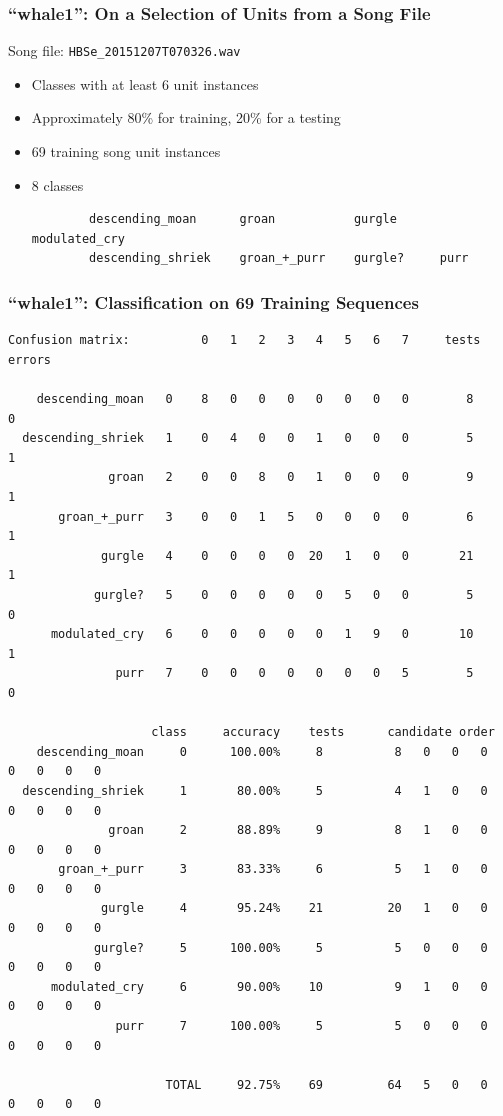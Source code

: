 \documentclass{beamer}
\begin{document}
\begin{frame}[fragile]
\frametitle{``whale1'': On a Selection of Units from a Song File}

Song file: \verb|HBSe_20151207T070326.wav|

\begin{itemize}
    \item Classes with at least 6 unit instances
    \item Approximately 80\% for training, 20\% for a testing
    \item 69 training song unit instances
    \item 8 classes
        \tiny{
        \begin{verbatim}
        descending_moan      groan           gurgle      modulated_cry
        descending_shriek    groan_+_purr    gurgle?     purr
        \end{verbatim}
        }
\end{itemize}

\end{frame}

\begin{frame}[fragile]
    \frametitle{``whale1'': Classification on 69 Training Sequences}

    \tiny{
    \begin{verbatim}
Confusion matrix:          0   1   2   3   4   5   6   7     tests   errors

    descending_moan   0    8   0   0   0   0   0   0   0        8       0
  descending_shriek   1    0   4   0   0   1   0   0   0        5       1
              groan   2    0   0   8   0   1   0   0   0        9       1
       groan_+_purr   3    0   0   1   5   0   0   0   0        6       1
             gurgle   4    0   0   0   0  20   1   0   0       21       1
            gurgle?   5    0   0   0   0   0   5   0   0        5       0
      modulated_cry   6    0   0   0   0   0   1   9   0       10       1
               purr   7    0   0   0   0   0   0   0   5        5       0

                    class     accuracy    tests      candidate order
    descending_moan     0      100.00%     8          8   0   0   0   0   0   0   0
  descending_shriek     1       80.00%     5          4   1   0   0   0   0   0   0
              groan     2       88.89%     9          8   1   0   0   0   0   0   0
       groan_+_purr     3       83.33%     6          5   1   0   0   0   0   0   0
             gurgle     4       95.24%    21         20   1   0   0   0   0   0   0
            gurgle?     5      100.00%     5          5   0   0   0   0   0   0   0
      modulated_cry     6       90.00%    10          9   1   0   0   0   0   0   0
               purr     7      100.00%     5          5   0   0   0   0   0   0   0

                      TOTAL     92.75%    69         64   5   0   0   0   0   0   0
    \end{verbatim}
    }

\end{frame}
\end{document}
